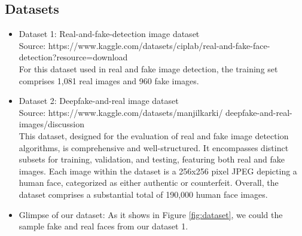 \documentclass[final]{cvpr}
\begin{document}
\subsection{Datasets}
\begin{itemize}
    \item Dataset 1: Real-and-fake-detection image dataset  \\
    Source: https://www.kaggle.com/datasets/ciplab/real-and-fake-face-detection?resource=download \\
    For this dataset used in real and fake image detection, the training set comprises 1,081 real images and 960 fake images\cite{kaggledatasetRealAndFakeFaceDetection}.
    \item Dataset 2: Deepfake-and-real image dataset  \\
    Source: https://www.kaggle.com/datasets/manjilkarki/
    deepfake-and-real-images/discussion \\
    This dataset, designed for the evaluation of real and fake image detection algorithms, is comprehensive and well-structured. It encompasses distinct subsets for training, validation, and testing, featuring both real and fake images. Each image within the dataset is a 256x256 pixel JPEG depicting a human face, categorized as either authentic or counterfeit. Overall, the dataset comprises a substantial total of 190,000 human face images\cite{kaggledatadeepfakeandrealimages, le2021openforensics}.

    \item Glimpse of our dataset: As it shows in Figure \ref{fig:dataset}, we could the sample fake and real faces from our dataset 1.
    

\end{itemize}
\end{document}
